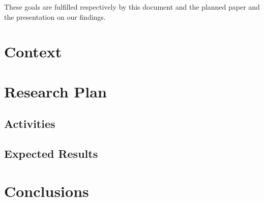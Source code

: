 \documentclass[a4paper]{scrartcl}
\begin{document}
			These goals are fulfilled respectively by this document and the planned paper and the
			presentation on our findings.

	\section{Context}

	\section{Research Plan}

		\subsection{Activities}

		\subsection{Expected Results}

	\section{Conclusions}

\end{document}
